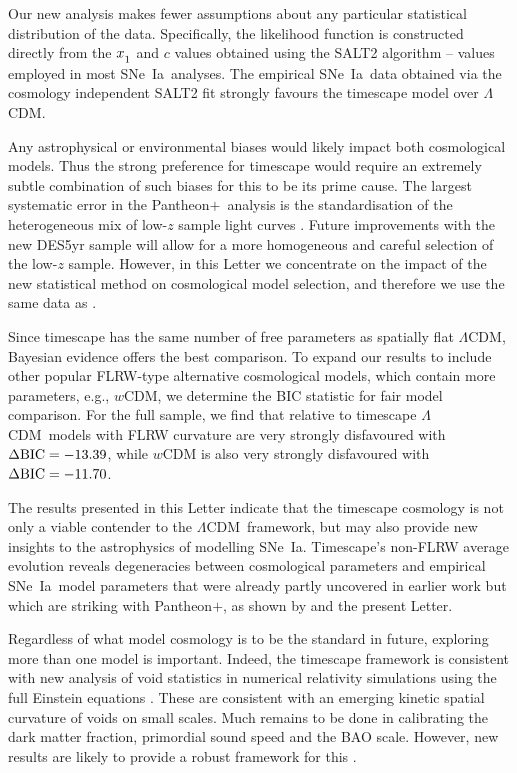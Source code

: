 \documentclass[fleqn,usenatbib]{mnras}
\newcommand{\pplus}{Pantheon$+$}
\newcommand{\LA}{\Lambda}
\newcommand{\LCDM}{$\LA$CDM}
\newcommand{\lcdm}{spatially flat $\LA$CDM}
\newcommand{\sne}{SNe~Ia}
\newcommand{\laneetal}{\citet{Lane_2023}}
\newcommand{\Z}[1]{_{\lower2pt\hbox{$\scriptstyle#1$}}}
\begin{document}
Our new analysis makes fewer assumptions about any particular statistical distribution of the data. Specifically, the likelihood function is constructed directly from the $x\Z 1$ and $c$ values obtained using the SALT2 algorithm -- values employed in most \sne\ analyses. The empirical \sne\ data obtained via the cosmology independent SALT2 fit strongly favours the timescape model over \LCDM.

Any astrophysical or environmental biases would likely impact both cosmological models. Thus the strong preference for timescape would require an extremely subtle combination of such biases for this to be its prime cause.
The largest systematic error in the \pplus\ analysis is the standardisation of the heterogeneous mix of low-$z$ sample light curves \citep{DES_2024, Lane_2023}.  Future improvements with the new DES5yr sample \citep{DES_2024} will allow for a more homogeneous and careful selection of the low-$z$ sample. However, in this Letter we concentrate on the impact of the new statistical method on cosmological model selection, and therefore we use the same data as \laneetal. 

Since timescape has the same number of free parameters as \lcdm, Bayesian evidence offers the best comparison. To expand our results to include other popular FLRW-type alternative cosmological models, which contain more parameters, e.g., $w$CDM, we determine the BIC statistic \citep{Schwarz_1978, Kass_1995} for fair model comparison. For the full sample, we find that relative to timescape \LCDM\ models with FLRW curvature are very strongly disfavoured with $\Delta{\rm BIC} = -13.39$, while $w$CDM is also very strongly disfavoured with $\Delta{\rm BIC} = -11.70$.

The results presented in this Letter indicate that the timescape cosmology is not only a viable contender to the \LCDM\ framework, but may also provide new insights to the astrophysics of modelling \sne. 
Timescape's non-FLRW average evolution reveals degeneracies between cosmological parameters and empirical \sne\ model parameters that were already partly uncovered in earlier work \citep{Dam_2017} but which are striking with \pplus, as shown by \citet{Lane_2023} and the present Letter. 

Regardless of what model cosmology is to be the standard in future, exploring more than one model is important. Indeed, the timescape framework is consistent with new analysis of void statistics in numerical relativity simulations using the full Einstein equations \citep{Williams_2024}. These are consistent with an emerging kinetic spatial curvature of voids on small scales. Much remains to be done in calibrating the dark matter fraction, primordial sound speed and the BAO scale. However, new results are likely to provide a robust framework for this \citep{Galoppo_2024a,Galoppo_2024b}.
\end{document}
